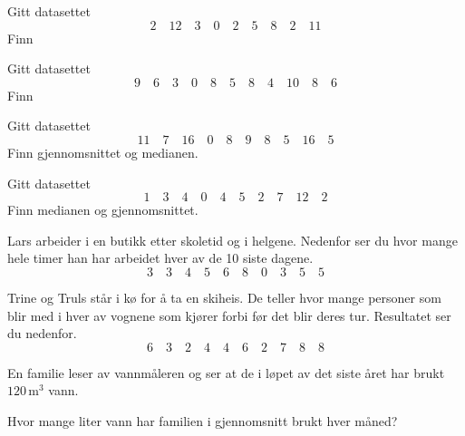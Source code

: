 




\opgt

\nes \nes

Gitt datasettet
\[ 2\quad12\quad 3\quad 0\quad 2\quad 5\quad 8\quad2\quad 11 \]
Finn \os
{}

Gitt datasettet
	\[ 9\quad6\quad 3\quad 0\quad 8\quad 5\quad 8\quad4\quad 10\quad 8 \quad 6 \]
Finn \os
{}

Gitt datasettet
\[ 11\quad7\quad 16\quad 0\quad 8\quad 9\quad 8\quad5\quad 16\quad 5 \]
Finn gjennomsnittet og medianen.

Gitt datasettet
\[ 1 \quad 3 \quad 4 \quad 0 \quad 4 \quad 5 \quad 2 \quad 7 \quad 12 \quad 2 \]
Finn medianen og gjennomsnittet.

Lars arbeider i en butikk etter skoletid og i helgene. Nedenfor ser du hvor mange hele
timer han har arbeidet hver av de 10 siste dagene.
\[ 3 \quad 3 \quad 4 \quad 5 \quad 6 \quad 8 \quad 0 \quad 3 \quad 5 \quad 5 \]

Trine og Truls står i kø for å ta en skiheis. De teller hvor mange personer som blir
med i hver av vognene som kjører forbi før det blir deres tur. Resultatet ser du
nedenfor.
\[ 6 \quad 3 \quad 2 \quad 4 \quad 4 \quad 6 \quad 2 \quad 7 \quad 8 \quad 8 \]


En familie leser av vannmåleren og ser at de i løpet av det siste
året har brukt $120\,\text{m}^3$ vann.\os

Hvor mange liter vann har familien i gjennomsnitt brukt hver måned?


